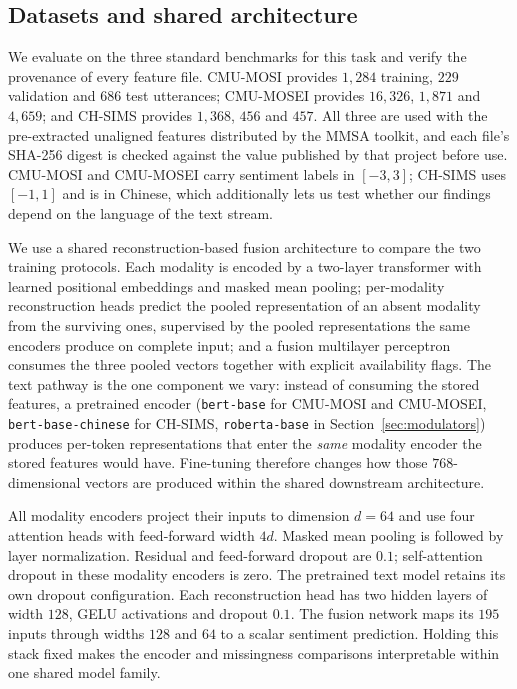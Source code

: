 \documentclass[preprint,11pt]{elsarticle}
\begin{document}
\subsection{Datasets and shared architecture}

We evaluate on the three standard benchmarks for this task and verify the
provenance of every feature file. CMU-MOSI provides $1{,}284$ training,
$229$ validation and $686$ test utterances; CMU-MOSEI provides $16{,}326$,
$1{,}871$ and $4{,}659$; and CH-SIMS provides $1{,}368$, $456$ and $457$. All
three are used with the pre-extracted unaligned features distributed by the
MMSA toolkit, and each file's SHA-256 digest is checked against the value
published by that project before use. CMU-MOSI and CMU-MOSEI
carry sentiment labels in $[-3,3]$; CH-SIMS uses $[-1,1]$ and is in Chinese,
which additionally lets us test whether our findings depend on the language of
the text stream.

We use a shared reconstruction-based fusion architecture to compare the two
training protocols. Each modality is encoded by a
two-layer transformer with learned positional embeddings and masked mean
pooling; per-modality reconstruction heads predict the pooled representation
of an absent modality from the surviving ones, supervised by the pooled
representations the same encoders produce on complete input; and a fusion
multilayer perceptron consumes the three pooled vectors together with explicit
availability flags. The text pathway is the one component we vary: instead of
consuming the stored features, a pretrained encoder (\texttt{bert-base} for
CMU-MOSI and CMU-MOSEI, \texttt{bert-base-chinese} for CH-SIMS,
\texttt{roberta-base} in Section~\ref{sec:modulators}) produces per-token
representations that enter the \emph{same} modality encoder the stored
features would have. Fine-tuning therefore changes how those $768$-dimensional
vectors are produced within the shared downstream architecture.

All modality encoders project their inputs to dimension $d=64$ and use
four attention heads with feed-forward width $4d$. Masked mean pooling is
followed by layer normalization. Residual and feed-forward dropout are $0.1$;
self-attention dropout in these modality encoders is zero. The pretrained
text model retains its own dropout configuration. Each reconstruction head
has two hidden layers of width $128$, GELU activations and dropout $0.1$.
The fusion network maps its $195$ inputs through widths $128$ and $64$ to a
scalar sentiment prediction. Holding this stack fixed makes the encoder and
missingness comparisons interpretable within one shared model family.
\end{document}
